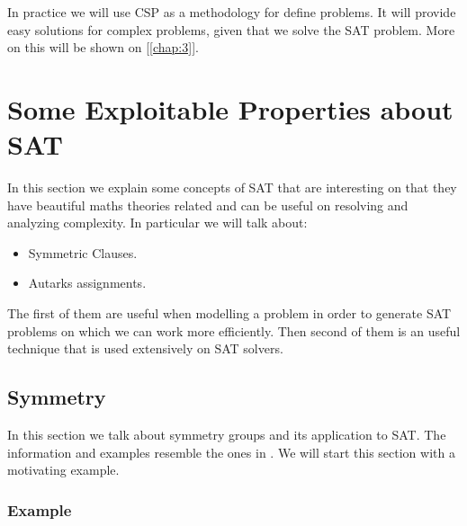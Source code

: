 In practice we will use CSP as a methodology for define problems. It will provide easy solutions for complex problems, given that we solve the SAT problem. More on this will be shown on [\ref{chap:3}].

\section{Some Exploitable Properties about SAT}
In this section we explain some concepts of SAT that are interesting on that they have beautiful maths theories related and can be useful on resolving and analyzing complexity. In particular we will talk about:
\begin{itemize}
\item Symmetric Clauses. 
\item Autarks assignments.
\end{itemize}

The first of them are useful when modelling a problem in order to generate SAT problems on which we can work more efficiently. Then second of them is an useful technique that is used extensively on SAT solvers.


\subsection{Symmetry}

In this section we talk about symmetry groups and its application to SAT. The information and examples resemble the ones in \cite{sakallah2009symmetry}. We will start this section with a motivating example.
\subsubsection{Example}

